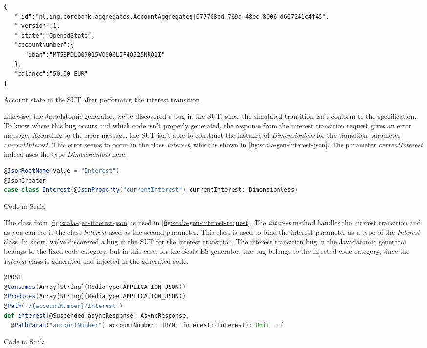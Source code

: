 \begin{sourcecode}[h!]
\begin{lstlisting}[]
{
   "_id":"nl.ing.corebank.aggregates.AccountAggregate$|077708cd-769a-48ec-8006-d607241c4f45",
   "_version":1,
   "_state":"OpenedState",
   "accountNumber":{
      "iban":"MT58PDLQ09015VOS06LIF4Q525NRO1I"
   },
   "balance":"50.00 EUR"
}
\end{lstlisting}
\caption{Account state in the SUT after performing the interest transition}
\label{fig:interest-opened-account-scalaes-json}
\end{sourcecode}

Likewise, the Javadatomic generator, we've discovered a bug in the SUT, since
the simulated transition isn't conform to the specification. To know where this
bug occurs and which code isn't properly generated, the response from the
interest transition request gives an error message. According to the error
message, the SUT isn't able to construct the instance of \textit{Dimensionless}
for the transition parameter \textit{currentInterest}. This error seems to occur
in the class \textit{Interest}, which is shown in
\autoref{fig:scala-gen-interest-json}. The parameter \textit{currentInterest}
indeed uses the type \textit{Dimensionless} here.

\begin{sourcecode}[h!]
\begin{lstlisting}[language=scala]
@JsonRootName(value = "Interest")
@JsonCreator
case class Interest(@JsonProperty("currentInterest") currentInterest: Dimensionless)
\end{lstlisting}
\caption{Code in Scala}
\label{fig:scala-gen-interest-json}
\end{sourcecode}

The class from \autoref{fig:scala-gen-interest-json} is used in
\autoref{fig:scala-gen-interest-request}. The \textit{interest} method handles
the interest transition and as you can see is the class \textit{Interest} used
as the second parameter. This class is used to bind the interest parameter as a
type of the \textit{Interest} class. In short, we've discovered a bug in the SUT
for the interest transition. The interest transition bug in the Javadatomic
generator belongs to the fixed code category, but in this case, for the Scala-ES
generator, the bug belongs to the injected code category, since the
\textit{Interest} class is generated and injected in the generated code.

\begin{sourcecode}[h!]
\begin{lstlisting}[language=scala]
@POST
@Consumes(Array[String](MediaType.APPLICATION_JSON))
@Produces(Array[String](MediaType.APPLICATION_JSON))
@Path("/{accountNumber}/Interest")
def interest(@Suspended asyncResponse: AsyncResponse,
  @PathParam("accountNumber") accountNumber: IBAN, interest: Interest): Unit = {
\end{lstlisting}
\caption{Code in Scala}
\label{fig:scala-gen-interest-request}
\end{sourcecode}


